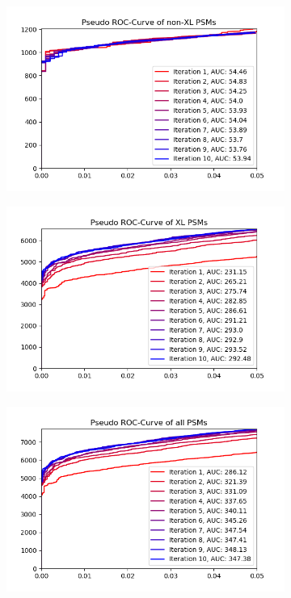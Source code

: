 \begin{figure}
	\normalsize
	\centering
	\begin{subfigure}{0.49\textwidth}
		\includegraphics[width = \textwidth]{figures/pseudoROC_non-XL.png}
		\caption{}
		\label{fig:results:pseudo_rocs_nXL}
	\end{subfigure}
	\hfill
	\begin{subfigure}{0.49\textwidth}
		\includegraphics[width = \textwidth]{figures/pseudoROC_XL.png}
		\caption{}
		\label{fig:results:pseudo_rocs_XL}
	\end{subfigure}
	\hfill
	\begin{subfigure}{0.49\textwidth}
		\includegraphics[width = \textwidth]{figures/pseudoROC_all.png}

\end{subfigure}
\end{figure}
